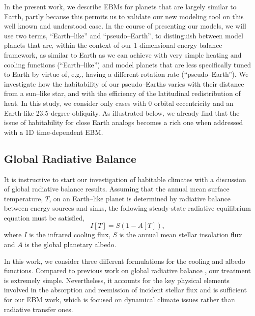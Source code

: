 In the present work, we describe EBMs for planets that are largely
similar to Earth, partly because this permits us to validate our new
modeling tool on this well known and understood case.  In the course
of presenting our models, we will use two terms, ``Earth--like'' and
``pseudo--Earth'', to distinguish between model planets that are,
within the context of our 1-dimensional energy balance framework, as
similar to Earth as we can achieve with very simple heating and
cooling functions (``Earth--like'') and model planets that are less
specifically tuned to Earth by virtue of, e.g., having a different
rotation rate (``pseudo--Earth'').  We investigate how the
habitability of our pseudo--Earths varies with their distance from a
sun--like star, and with the efficiency of the latitudinal
redistribution of heat. In this study, we consider only cases with 0
orbital eccentricity and an Earth-like 23.5-degree obliquity.  As
illustrated below, we already find that the issue of habitability for
close Earth analogs becomes a rich one when addressed with a 1D
time-dependent EBM.


\subsection{Global Radiative Balance}
\label{hab_ssec:globrad}

It is instructive to start our investigation of habitable climates
with a discussion of global radiative balance results. Assuming that
the annual mean surface temperature, $T$, on an Earth--like planet is
determined by radiative balance between energy sources and sinks, the
following steady-state radiative equilibrium equation must be
satisfied,
\begin{equation}
\label{eq:rad eq}
I[T] = S (1 - A[T]),
\end{equation}
where $I$ is the infrared cooling flux, $S$ is the annual mean stellar
insolation flux and $A$ is the global planetary albedo.

In this work, we consider three different formulations for the cooling
and albedo functions. Compared to previous work on global radiative
balance \citep[e.g.][]{kasting_et_al1993}, our treatment is extremely
simple. Nevertheless, it accounts for the key physical elements
involved in the absorption and reemission of incident stellar flux and
is sufficient for our EBM work, which is focused on dynamical climate
issues rather than radiative transfer ones.

